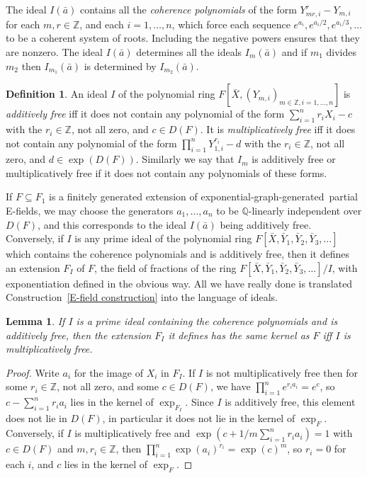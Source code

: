 \documentclass[12pt]{amsart}
\newtheorem{lemma}[prop]{Lemma}
\theoremstyle{definition}
\newtheorem{defn}[prop]{Definition}
\begin{document}
The ideal $I(\bar{a})$ contains all the \emph{coherence polynomials} of the form $Y_{mr,i}^r - Y_{m,i}$ for each $m,r \in {\ensuremath{\mathbb{Z}}}$, and each $i = 1,\ldots,n$, which force each sequence $e^{a_i}, e^{a_i/2},e^{a_i/3},\ldots$ to be a coherent system of roots. Including the negative powers ensures that they are nonzero. The ideal $I({{\ensuremath{\bar{a}}}})$ determines all the ideals $I_m({{\ensuremath{\bar{a}}}})$ and if $m_1$ divides $m_2$ then $I_{m_1}(\bar{a})$ is determined by $I_{m_2}(\bar{a})$.

\begin{defn}
  An ideal $I$ of the polynomial ring $F[\bar{X},(Y_{m,i})_{m \in {\ensuremath{\mathbb{Z}}}, i=1,\ldots,n}]$ is \emph{additively free} iff it does not contain any polynomial of the form $\sum_{i=1}^n r_iX_i - c$ with the $r_i \in {\ensuremath{\mathbb{Z}}}$, not all zero, and $c \in D(F)$. It is \emph{multiplicatively free} iff it does not contain any polynomial of the form $\prod_{i=1}^n Y_{1,i}^{r_i} - d$ with the $r_i \in {\ensuremath{\mathbb{Z}}}$, not all zero, and $d \in \exp(D(F))$. Similarly we say that $I_m$ is additively free or multiplicatively free if it does not contain any polynomials of these forms.
\end{defn}
If $F {\subseteq} F_1$ is a finitely generated extension of {exponential-graph-generated}\ partial E-fields, we may choose the generators $a_1,\ldots,a_n$ to be ${\ensuremath{\mathbb{Q}}}$-linearly independent over $D(F)$, and this corresponds to the ideal $I({{\ensuremath{\bar{a}}}})$ being additively free. Conversely, if $I$ is any prime ideal of the polynomial ring $F[\bar{X},\bar{Y}_1,\bar{Y}_2,\bar{Y}_3,\ldots]$ which contains the coherence polynomials and is additively free, then it defines an extension $F_I$ of $F$, the field of fractions of the ring $F[\bar{X},\bar{Y}_1,\bar{Y}_2,\bar{Y}_3,\ldots]/I$, with exponentiation defined in the obvious way. All we have really done is translated Construction~\ref{E-field construction} into the language of ideals.
\begin{lemma}
  If $I$ is a prime ideal containing the coherence polynomials and is additively free, then the extension $F_I$ it defines has the same kernel as $F$ iff $I$ is multiplicatively free.
\end{lemma}
\begin{proof}
 Write $a_i$ for the image of $X_i$ in $F_I$. If $I$ is not multiplicatively free then for some $r_i \in {\ensuremath{\mathbb{Z}}}$, not all zero, and some $c \in D(F)$, we have $\prod_{i=1}^n e^{r_ia_i} = e^c$, so $c-\sum_{i=1}^n r_ia_i$ lies in the kernel of $\exp_{F_I}$. Since $I$ is additively free, this element does not lie in $D(F)$, in particular it does not lie in the kernel of $\exp_{F}$. Conversely, if $I$ is multiplicatively free and $\exp(c + 1/m\sum_{i=1}^n r_i a_i) = 1$ with $c \in D(F)$ and $m,r_i \in {\ensuremath{\mathbb{Z}}}$, then $\prod_{i=1}^n\exp(a_i)^{r_i} = \exp(c)^m$, so $r_i = 0$ for each $i$, and $c$ lies in the kernel of $\exp_{F}$.
\end{proof}
\end{document}
